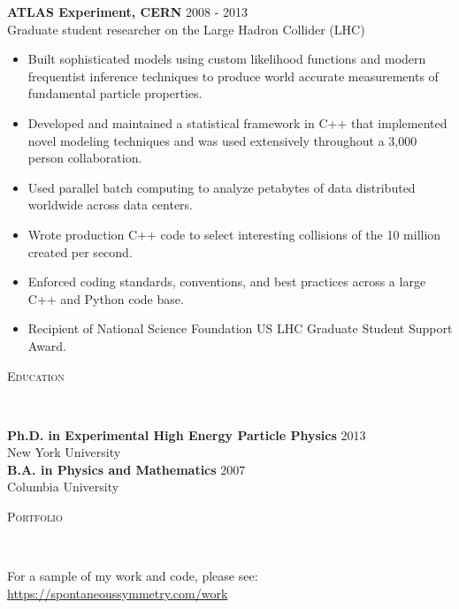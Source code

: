 \documentclass[9pt]{article}
\newenvironment{changemargin}[2]{%
  \begin{list}{}{%
    \setlength{\topsep}{0pt}%
    \setlength{\leftmargin}{#1}%
    \setlength{\rightmargin}{#2}%
    \setlength{\listparindent}{\parindent}%
    \setlength{\itemindent}{\parindent}%
    \setlength{\parsep}{\parskip}%
  }%
  \item[]}{\end{list}
}
\newcommand{\lineover}{
  \begin{changemargin}{-0.05in}{-0.05in}
    \vspace*{-8pt}
    \hrulefill \\
    \vspace*{-2pt}
  \end{changemargin}
}
\newcommand{\header}[1]{
  \begin{changemargin}{-0.5in}{-0.5in}
    \scshape{#1}\\
    \lineover
  \end{changemargin}
}
\newenvironment{body} {
  \vspace*{-16pt}
\begin{changemargin}{-0.25in}{-0.5in}
  }
{\end{changemargin}
}
\begin{document}
\begin{body}
        \medskip

        \textbf{ATLAS Experiment, CERN} \hfill 2008 - 2013\\
        Graduate student researcher on the Large Hadron Collider (LHC) \\
        \medskip

        \begin{itemize}

        \item Built sophisticated models using custom likelihood functions and modern frequentist inference techniques to produce world accurate measurements of fundamental particle properties.

        \item Developed and maintained a statistical framework in C++ that implemented novel modeling techniques and was used extensively throughout a 3,000 person collaboration.

        \item Used parallel batch computing to analyze petabytes of data distributed worldwide across data centers.

        \item Wrote production C++ code to select interesting collisions of the 10 million created per second.

        \item Enforced coding standards, conventions, and best practices across a large C++ and Python code base.

        \item Recipient of National Science Foundation US LHC Graduate Student Support Award.

        \end{itemize}

\end{body}

\smallskip

\header{Education}

\begin{body}
  \vspace{14pt}
  \textbf{Ph.D. in Experimental High Energy Particle Physics }{} \hfill 2013{} \\
  New York University \\
  \medskip
  \textbf{B.A. in Physics and Mathematics} \hfill 2007 \\
  Columbia University\\
\end{body}


\header{Portfolio}

\begin{body}
  \vspace{14pt}
  For a sample of my work and code, please see: {\url{https://spontaneoussymmetry.com/work}}
\end{body}
\end{document}
